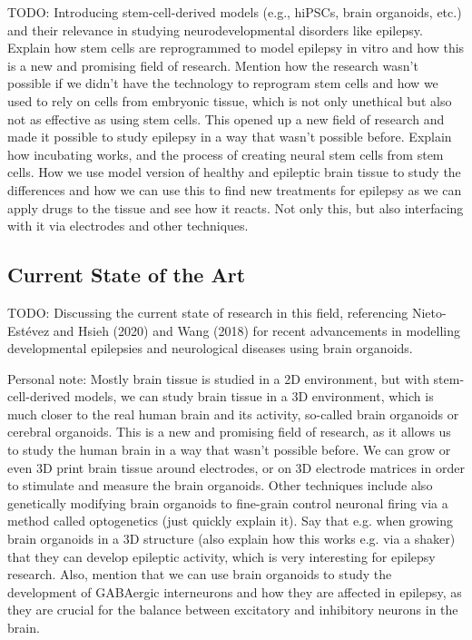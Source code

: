 \documentclass[10pt]{article}
\begin{document}
\begin{sloppypar}
  TODO: Introducing stem-cell-derived models (e.g., hiPSCs, brain organoids, etc.) and their relevance in studying neurodevelopmental disorders like epilepsy. Explain how stem cells are reprogrammed to model epilepsy in vitro and how this is a new and promising field of research. Mention how the research wasn't possible if we didn't have the technology to reprogram stem cells and how we used to rely on cells from embryonic tissue, which is not only unethical but also not as effective as using stem cells. This opened up a new field of research and made it possible to study epilepsy in a way that wasn't possible before. Explain how incubating works, and the process of creating neural stem cells from stem cells. How we use model version of healthy and epileptic brain tissue to study the differences and how we can use this to find new treatments for epilepsy as we can apply drugs to the tissue and see how it reacts. Not only this, but also interfacing with it via electrodes and other techniques.

  \subsection{Current State of the Art}
  \label{sec:current-state-of-the-art}

  TODO: Discussing the current state of research in this field, referencing Nieto-Estévez and Hsieh (2020) and Wang (2018) for recent advancements in modelling developmental epilepsies and neurological diseases using brain organoids.

  Personal note: Mostly brain tissue is studied in a 2D environment, but with stem-cell-derived models, we can study brain tissue in a 3D environment, which is much closer to the real human brain and its activity, so-called brain organoids or cerebral organoids. This is a new and promising field of research, as it allows us to study the human brain in a way that wasn't possible before. We can grow or even 3D print brain tissue around electrodes, or on 3D electrode matrices in order to stimulate and measure the brain organoids. Other techniques include also genetically modifying brain organoids to fine-grain control neuronal firing via a method called optogenetics (just quickly explain it). Say that e.g. when growing brain organoids in a 3D structure (also explain how this works e.g. via a shaker) that they can develop epileptic activity, which is very interesting for epilepsy research. Also, mention that we can use brain organoids to study the development of GABAergic interneurons and how they are affected in epilepsy, as they are crucial for the balance between excitatory and inhibitory neurons in the brain.


\end{sloppypar}
\end{document}
